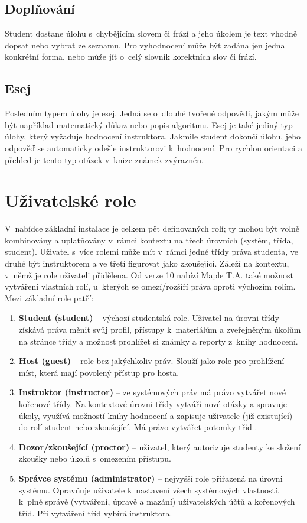\documentclass[
print,
  11pt,
  table,   
  nolof,    
  nolot,
  oneside,
  draft
]{fithesis3}
\begin{document}
	\subsection{Doplňování}
Student dostane úlohu s~chybějícím slovem či frází a jeho úkolem je text vhodně dopsat nebo vybrat ze seznamu. Pro vyhodnocení může být zadána jen jedna konkrétní forma, nebo může jít o~celý slovník korektních slov či frází.
 
	\subsection{Esej}
Posledním typem úlohy je esej. Jedná se o~dlouhé tvořené odpovědi, jakým může být například matematický důkaz nebo popis algoritmu. Esej je také jediný typ úlohy, který vyžaduje hodnocení instruktora. Jakmile student dokončí úlohu, jeho odpověď se automaticky odešle instruktorovi k~hodnocení. Pro rychlou orientaci a přehled je tento typ otázek v~knize známek zvýrazněn.



	\section{Uživatelské role}
V~nabídce základní instalace je celkem pět definovaných rolí; ty mohou být volně kombinovány a uplatňovány v~rámci kontextu na třech úrovních (systém, třída, student). Uživatel s~více rolemi může mít v~rámci jedné třídy práva studenta, ve druhé být instruktorem a ve třetí figurovat jako zkoušející. Záleží na kontextu, v~němž je role uživateli přidělena. Od verze 10 nabízí Maple T.A. také možnost vytváření vlastních rolí, u~kterých se omezí/rozšíří práva oproti výchozím rolím. Mezi základní role patří:
\begin{enumerate}
\item \textbf{Student (student)} -- výchozí studentská role. Uživatel na úrovni třídy získává práva měnit svůj profil, přístupy k~materiálům a zveřejněným úkolům na stránce třídy a možnost prohlížet si známky a reporty z~knihy hodnocení.
\item \textbf{Host (guest)} -- role bez jakýchkoliv práv. Slouží jako role pro prohlížení míst, která mají povolený přístup pro hosta.
\item \textbf{Instruktor (instructor)} -- ze systémových práv má právo vytvářet no\-vé kořenové třídy. Na kontextové úrovni třídy vytváří nové otázky a spravuje úkoly, využívá možností knihy hodnocení a zapisuje uživatele (již existující) do rolí student nebo zkoušející. Má právo vytvářet potomky tříd .
\item \textbf{Dozor/zkoušející (proctor)} -- uživatel, který autorizuje studenty ke složení zkoušky nebo úkolů s~omezením přístupu.
\item \textbf{Správce systému (administrator)} -- nejvyšší role přiřazená na úrovni systému. Opravňuje uživatele k~nastavení všech systémových vlastností, k~plné správě (vytváření, úpravě a mazání) uživatelských účtů a kořenových tříd. Při vytváření tříd vybírá instruktora.
\end{enumerate}
\end{document}
